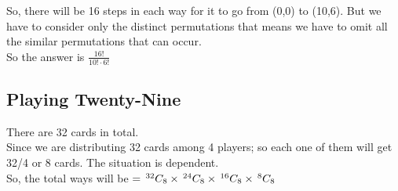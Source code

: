 \documentclass{article}
\begin{document}
So, there will be 16 steps in each way for it to go from (0,0) to (10,6). But we have to consider only the distinct permutations that means we have to omit all the similar permutations that can occur.\\
So the answer is $\frac{16!}{10!\cdot 6!}$


\subsection{Playing Twenty-Nine}
There are 32 cards in total.\\
Since we are distributing 32 cards among 4 players; so each one of them will get 32/4 or 8 cards.
The situation is dependent.\\
So, the total ways will be $= \,^{32} C _{8}\times\,^{24} C _{8}\times\,^{16} C _{8}\times\,^{8} C _{8}$
\end{document}
